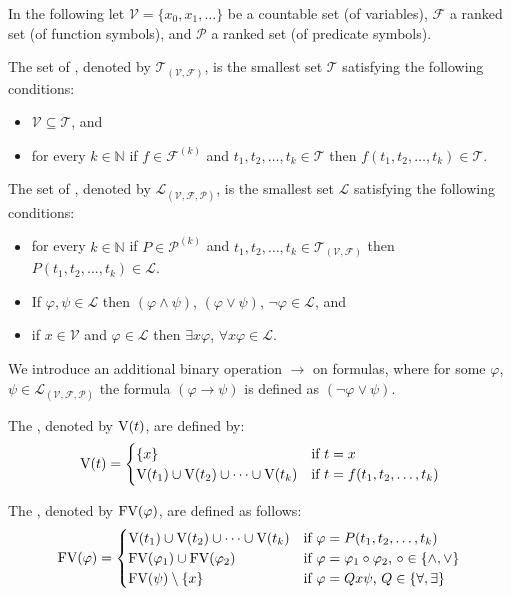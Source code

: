 In the following let $\mathcal{V}=\{x_0,x_1,\dots\}$ be a countable set (of variables), $\mathcal{F}$ a ranked set (of function symbols), and $\mathcal{P}$ a ranked set (of predicate symbols).
\begin{definition}
The set of , denoted by $\mathcal{T}_{(\mathcal{V},\mathcal{F})}$, is the smallest set $\mathcal{T}$ satisfying the following conditions:
\begin{itemize}
\item $\mathcal{V} \subseteq \mathcal{T}$, and
\item for every $k\in\mathbb{N}$ if $f\in\mathcal{F}^{(k)}$ and $t_1,t_2,\dots,t_k\in\mathcal{T}$ then $f(t_1,t_2,\dots,t_k)\in\mathcal{T}$.
\end{itemize}
The set of , denoted by $\mathcal{L}_{(\mathcal{V},\mathcal{F},\mathcal{P})}$, is the smallest set $\mathcal{L}$ satisfying the following conditions:
\begin{itemize}
\item for every $k\in\mathbb{N}$ if $P\in\mathcal{P}^{(k)}$ and $t_1,t_2,\dots,t_k\in\mathcal{T}_{(\mathcal{V},\mathcal{F})}$ then $P(t_1,t_2,\dots,t_k)\in\mathcal{L}$.
\item If $\varphi,\psi\in\mathcal{L}$ then $(\varphi\wedge\psi)$, $(\varphi\vee\psi)$, $\neg \varphi\in\mathcal{L}$, and
\item if $x\in\mathcal{V}$ and $\varphi\in\mathcal{L}$ then $\exists x\varphi$, $\forall x\varphi\in\mathcal{L}$. %
\end{itemize}
\end{definition}
We introduce an additional binary operation $\to$ on formulas, where for some $\varphi$, $\psi\in\mathcal{L}_{(\mathcal{V},\mathcal{F},\mathcal{P})}$ the formula $(\varphi\to\psi)$ is defined as $(\neg\varphi\vee\psi)$.

\begin{definition}
The , denoted by $\text{V}(t)$, are defined by:
\[\V(t)=
\begin{cases}
\{x\} & \text{if $t=x$}\\ %
\V(t_1)\cup \V(t_2)\cup\dots\cup \V(t_k) & \text{if $t=f(t_1,t_2,\dots,t_k)$}
\end{cases}\]

The , denoted by $\text{FV}(\varphi)$, are defined as follows:
\[\FV(\varphi)=
\begin{cases} %
\V(t_1)\cup \V(t_2)\cup\dots\cup \V(t_k) & \text{if $\varphi=P(t_1,t_2,\dots,t_k)$}\\
\FV(\varphi_1)\cup\FV(\varphi_2) & \text{if $\varphi=\varphi_1\circ\varphi_2$, $\circ\in\{\wedge,\vee\}$}\\
\FV(\psi)\setminus\{x\} & \text{if $\varphi=Q x\psi$, $Q\in\{\forall,\exists\}$}
\end{cases}\]
\end{definition}


